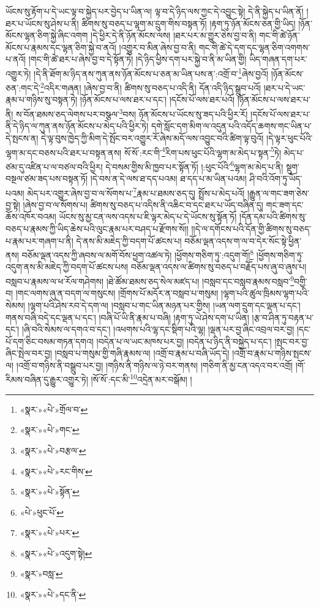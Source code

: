 ཡོངས་སུ་རྟོག་པ་དེ་ཡང་ལྟ་བ་སྐྱེད་པར་བྱེད་པ་ཡིན་ལ། ལྟ་བ་དེ་ཉིད་ལས་ཀྱང་དེ་འབྱུང་སྟེ། དེ་ནི་སྐྱེད་པ་ཡིན་ནོ། །ཐར་པ་ཡོངས་སུ་ཤེས་པ་ནི། ཚིགས་སུ་བཅད་པ་ལྷག་མ་དྲུག་གིས་བསྟན་ཏོ། །རྟག་ཏུ་ཉོན་མོངས་ཅན་གྱི་ཡིད། །ཉོན་མོངས་ལྷན་ཅིག་སྐྱེ་ཞིང་འགག །དེ་ཕྱིར་དེ་ནི་ཉོན་མོངས་ལས། །ཐར་པར་མ་གྱུར་ཅེས་བྱ་བ་ནི། གང་གི་ཚེ་ཉོན་མོངས་པ་རྣམས་དང་ལྷན་ཅིག་སྐྱེ་བ་ནའོ། །འགྱུར་བ་མིན་ཞེས་བྱ་བ་ནི། གང་གི་ཚེ་དེ་དག་དང་ལྷན་ཅིག་འགགས་པ་ནའོ། །གང་གི་ཚེ་ཐར་པ་ཞེས་བྱ་བ་དེ་སྟོན་ཏེ། །དེ་ཉིད་ཕྱིས་དག་པར་སྐྱེ་བ་ནི་མ་ཡིན་གྱི། ཡིད་གཞན་དག་པར་འགྱུར་ཏེ། །དེ་ནི་ཐོག་མ་ཉིད་ནས་ཀུན་ནས་ཉོན་མོངས་པ་ཅན་མ་ཡིན་པས་ན་:འགྲོ་བ་\footnote{«སྣར་»«པེ་»གྲོལ་བ་}ཞེས་བྱའོ། །ཉོན་མོངས་ཅན་:གང་དེ་\footnote{«སྣར་»«པེ་»གང་}འདིར་གཞན། །ཞེས་བྱ་བ་ནི། ཚིགས་སུ་བཅད་པ་འདི་ནི། དོན་འདི་ཉིད་སྒྲུབ་པའོ། །ཐར་པ་དེ་ཡང་རྣམ་པ་གཉིས་སུ་བསྟན་ཏེ། །ཉོན་མོངས་པ་ལས་ཐར་པ་དང་། །དངོས་པོ་ལས་ཐར་པའོ། །ཉོན་མོངས་པ་ལས་ཐར་པ་ནི། ས་བོན་ཐམས་ཅད་ལེགས་པར་བསྩལ་\footnote{«སྣར་»«པེ་»བརྩལ་}བས། ཉོན་མོངས་པ་ཡོངས་སུ་ཟད་པའི་ཕྱིར་རོ། །དངོས་པོ་ལས་ཐར་པ་ནི་དེ་ཉིད་ལ་ཀུན་ནས་ཉོན་མོངས་པ་མེད་པའི་ཕྱིར་ཏེ། དགེ་སློང་དག་མིག་ལ་འདུན་པའི་འདོད་ཆགས་གང་ཡིན་པ་དེ་སྤངས་ན། དེ་ལྟ་བུས་ཁྱེད་ཀྱི་མིག་དེ་སྤོང་བར་འགྱུར་རོ་ཞེས་མདོ་ལས་འབྱུང་བའི་ཚིག་ལྟ་བུའོ། །དེ་ལྟར་ཕུང་པོའི་ལྷག་མ་དང་བཅས་པའི་ཐར་པ་བསྟན་ནས། སོ་སོ་:རང་གི་\footnote{«སྣར་»«པེ་»རང་གིས་}རིག་པས་ཕུང་པོའི་ལྷག་མ་མེད་པ་སྟན་\footnote{«སྣར་»«པེ་»སྟོན་}ཏེ། མེད་པ་ཙམ་དུ་འཛིན་པ་ལ་བཙལ་བའི་ཕྱིར། དེ་བསམ་གྱིས་མི་ཁྱབ་པར་སྟོན་ཏོ། །:ཕུང་པོའི་\footnote{«པེ་»ཕུང་པོ་}ལྷག་མ་མེད་པ་ནི། སྡུག་བསྔལ་ཙམ་ཟད་པས་བསྟན་ཏོ། །དེ་བས་ན་དེ་ལས་ཐ་དད་པའམ། ཐ་དད་པ་མ་ཡིན་པའམ། ཤི་བའི་འོག་ཏུ་ཡོད་པའམ། མེད་པར་འགྱུར་ཞེས་བྱ་བ་ལ་སོགས་པ་\footnote{«སྣར་»«པེ་»པར་}རྣམ་པ་ཐམས་ཅད་དུ། སྤྲོས་པ་མེད་པའོ། །རྒྱུན་ལ་གང་ཟག་ཅེས་བྱ་སྟེ། །ཞེས་བྱ་བ་ལ་སོགས་པ། ཚིགས་སུ་བཅད་པ་འདིས་ནི་འཆིང་བ་དང་ཐར་པ་ཡོད་བཞིན་དུ། གང་ཟག་དང་ཆོས་འཁོར་བའམ། ཡོངས་སུ་མྱ་ངན་ལས་འདས་པ་ཇི་ལྟར་མེད་པ་དེ་ཡོངས་སུ་སྟོན་ཏོ། །དོན་དམ་པའི་ཚིགས་སུ་བཅད་པ་རྣམས་ཀྱི་ཡིད་ཆེས་པའི་ལུང་རྣམ་པར་བཤད་པ་རྫོགས་སོ།། །།དེ་ལ་དགོངས་པའི་དོན་གྱི་ཚིགས་སུ་བཅད་པ་རྣམ་པར་གཞག་པ་ནི། དེ་ནས་མི་མཇེད་ཀྱི་བདག་པོ་ཚངས་པ། བཅོམ་ལྡན་འདས་ག་ལ་བ་དེར་སོང་སྟེ་ཕྱིན་ནས། བཅོམ་ལྡན་འདས་ཀྱི་ཞབས་ལ་མགོ་བོས་ཕྱག་འཚལ་ཏེ། །ཕྱོགས་གཅིག་ཏུ་:འདུག་གོ།\footnote{«སྣར་»«པེ་»འདུག་སྟེ།} །ཕྱོགས་གཅིག་ཏུ་འདུག་ནས་མི་མཇེད་ཀྱི་བདག་པོ་ཚངས་པས། བཅོམ་ལྡན་འདས་ལ་ཚིགས་སུ་བཅད་པ་བརྗོད་པས་ཞུ་བ་ཞུས་པ། བསླབ་པ་རྣམས་ལ་ཕ་རོལ་གཤེགས། །ཐེ་ཚོམ་ཐམས་ཅད་སེལ་མཛད་པ། །བསླབ་དང་བསླབ་རྣམས་བསླབ་\footnote{«སྣར་»བསླ་}བགྱི་བ། །གང་ལགས་ཞུ་ན་བདག་ལ་གསུངས། །གྲོགས་པོ་མདོར་ན་བསླབ་པ་གསུམ། །ལྷག་པའི་ཚུལ་ཁྲིམས་ལྷག་པའི་སེམས། །ལྷག་པའི་ཤེས་རབ་དེ་དག་ལ། །བསླབ་པ་གང་ཡིན་མཉན་པར་གྱིས། །ཡན་ལག་དྲུག་དང་ལྡན་པ་དང་། གནས་བཞི་བདེ་དང་ལྡན་པ་དང་། །བཞི་པོ་ཡི་ནི་རྣམ་པ་བཞི། །རྟག་ཏུ་ཡེ་ཤེས་དག་པ་ཡིན། །རྩ་བ་ཤིན་ཏུ་བརྟན་པ་དང་། །ཞི་བའི་སེམས་ལ་དགའ་བ་དང་། །འཕགས་པའི་ལྷ་དང་སྡིག་པའི་ལྷ། །ལྡན་པར་བྱ་ཞིང་འབྲལ་བར་བྱ། །དང་པོ་དག་ཅིང་བསམ་གཏན་དགའ། །བདེན་པ་ལ་ཡང་མཁས་པར་བྱ། །བདེན་པ་ཉིད་ནི་བསྐྱེད་པ་དང་། །སྤང་བར་བྱ་ཞིང་སྤེལ་བར་བྱ། །བསླབ་པ་གསུམ་གྱི་གཞི་རྣམས་ལ། །འགྲོ་བ་རྣམ་པ་བཞི་ཡོད་དེ། །འགྲོ་བ་རྣམ་པ་གཉིས་སྤངས་ལ། །འགྲོ་བ་གཉིས་ནི་བསྒྲུབ་པར་བྱ། །གཉིས་ནི་གཉིས་ལ་ཉེ་བར་གནས། །གཅིག་ནི་མྱ་ངན་འདའ་བར་འགྲོ། །གོ་རིམས་བཞིན་དུ་རྒྱུར་འགྱུར་ཏེ། །སོ་སོ་:དང་མི་\footnote{«སྣར་»«པེ་»དང་ནི་}འདྲེན་མར་བསྒོམ། །
